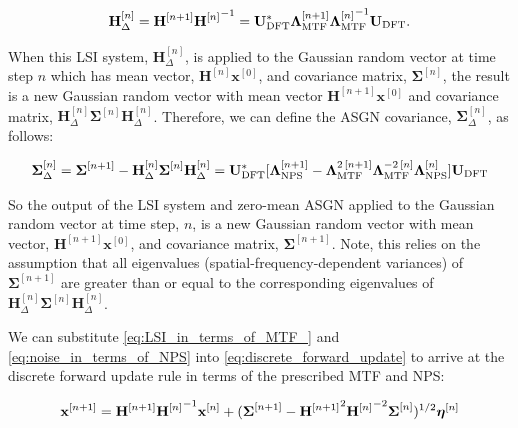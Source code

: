 \documentclass[12pt,]{article}
\begin{document}
\begin{gather}
    \mathbf{H}_\Delta^{[n]}  = \mathbf{H}^{[n+1]} {\mathbf{H}^{[n]}}^{-1} = \mathbf{U}^*_\text{DFT} \boldsymbol{\Lambda}_{\text{MTF}}^{[n+1]} {\boldsymbol{\Lambda}_{\text{MTF}}^{[n]}}^{\hspace{-3mm}-1} \mathbf{U}_\text{DFT} . \label{eq:LSI_in_terms_of_MTF_}
\end{gather}

\noindent When this LSI system, $\mathbf{H}_\Delta^{[n]}$, is applied to the Gaussian random vector at time step $n$ which has mean vector, $\mathbf{H}^{[n]} \mathbf{x}^{[0]}$, and covariance matrix, $\boldsymbol{\Sigma}^{[n]}$, the result is a new Gaussian random vector with mean vector $\mathbf{H}^{[n+1]} \mathbf{x}^{[0]}$ and covariance matrix, $\mathbf{H}_\Delta^{[n]} \boldsymbol{\Sigma}^{[n]}  \mathbf{H}_\Delta^{[n]}$. Therefore, we can define the ASGN covariance, $\boldsymbol{\Sigma}_\Delta^{[n]}$, as follows:

\begin{gather}
    \boldsymbol{\Sigma}_\Delta^{[n]} = \boldsymbol{\Sigma}^{[n+1]} - \mathbf{H}_\Delta^{[n]} \boldsymbol{\Sigma}^{[n]}  \mathbf{H}_\Delta^{[n]} =  \mathbf{U}^*_\text{DFT}[ \boldsymbol{\Lambda}_{\text{NPS}}^{[n+1]} - \boldsymbol{\Lambda}_{\text{MTF}}^{2 \hspace{0.5mm} [n+1]} \boldsymbol{\Lambda}_{\text{MTF}}^{-2 \hspace{0.5mm} [n]}
    \boldsymbol{\Lambda}_{\text{NPS}}^{[n]} ] \mathbf{U}_\text{DFT} \label{eq:noise_in_terms_of_NPS}
\end{gather}

\noindent So the output of the LSI system and zero-mean ASGN applied to the Gaussian random vector at time step, $n$, is a new Gaussian random vector with mean vector, $\mathbf{H}^{[n+1]} \mathbf{x}^{[0]}$, and covariance matrix, $\boldsymbol{\Sigma}^{[n+1]}$. Note, this relies on the assumption that all eigenvalues (spatial-frequency-dependent variances) of $\boldsymbol{\Sigma}^{[n+1]}$ are greater than or equal to the corresponding eigenvalues of $\mathbf{H}_\Delta^{[n]} \boldsymbol{\Sigma}^{[n]}  \mathbf{H}_\Delta^{[n]}$.

We can substitute \eqref{eq:LSI_in_terms_of_MTF_} and \eqref{eq:noise_in_terms_of_NPS} into \eqref{eq:discrete_forward_update} to arrive at the discrete forward update rule in terms of the prescribed MTF and NPS:

\begin{gather}
    \mathbf{x}^{[n + 1]} = \mathbf{H}^{[n + 1]} {\mathbf{H}^{[n]}}^{\hspace{0mm}-1} \mathbf{x}^{[n]} + (\boldsymbol{\Sigma}^{[n+1]} -  {\mathbf{H}^{[n+1]}}^{\hspace{-0mm} 2} {\mathbf{H}^{[n]}}^{\hspace{0mm}-2} \boldsymbol{\Sigma}^{[n]} )^{1/2} \boldsymbol{\eta}^{[n]}
    \label{eq:discrete_forward_update_MTF_NPS}
\end{gather}
\end{document}
